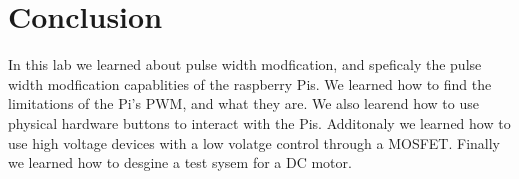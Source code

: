\documentclass[prl,12pt,notitlepage,aps,onecolumn,superscriptaddress]{revtex4-1}
\begin{document}
\section{Conclusion}
In this lab we learned about pulse width modfication, and speficaly the pulse width modfication capablities of the raspberry Pis. We learned how to find the limitations of the Pi's PWM, and what they are. We also learend how to use physical hardware buttons to interact with the Pis. Additonaly we learned how to use high voltage devices with a low volatge control through a MOSFET. Finally we learned how to desgine a test sysem for a DC motor.


\end{document}
